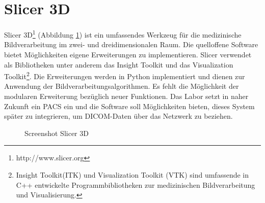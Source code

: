 \section{Slicer 3D}

Slicer 3D\footnote{http://www.slicer.org} (Abbildung \ref{slicer3d}) ist ein umfassendes Werkzeug für die medizinische Bildverarbeitung im zwei- und dreidimensionalen Raum. Die quelloffene Software bietet Möglichkeiten eigene Erweiterungen zu implementieren. Slicer verwendet als Bibliotheken unter anderem das Insight Toolkit und das Visualization Toolkit\footnote{Insight Toolkit(ITK) und Visualization Toolkit (VTK) sind umfassende in C++ entwickelte Programmbibliotheken zur medizinischen Bildverarbeitung und Visualisierung.}. Die Erweiterungen werden in Python implementiert und dienen zur Anwendung der Bildverarbeitungsalgorithmen. Es fehlt die Möglichkeit der modularen Erweiterung bezüglich neuer Funktionen. Das Labor setzt in naher Zukunft ein PACS ein und die Software soll Möglichkeiten bieten, dieses System später zu integrieren, um DICOM-Daten über das Netzwerk zu beziehen.

\begin{figure}[htbp]
  \vspace{0.5cm}
  \centering
  \caption{Screenshot Slicer 3D}
  \label{slicer3d}
  \vspace{0.5cm}
\end{figure}

